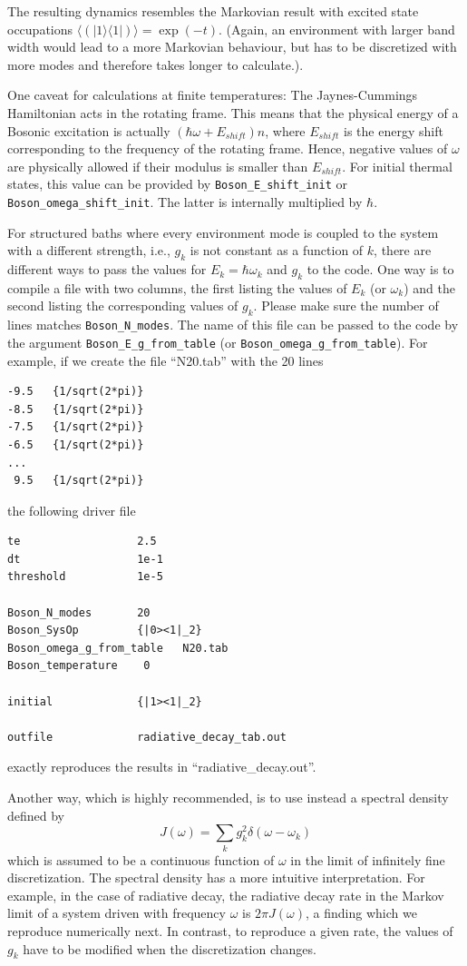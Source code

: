 \documentclass{scrartcl}
\begin{document}
The resulting dynamics resembles the Markovian result with excited state
occupations
$\langle (|1\rangle\langle 1|) \rangle= \exp(-t)$. 
(Again, an environment with larger band width would lead to a more Markovian 
behaviour, but has to be discretized with more modes and therefore takes
longer to calculate.).

One caveat for calculations at finite temperatures: The Jaynes-Cummings 
Hamiltonian acts in the rotating frame. This means that the physical energy 
of a Bosonic excitation is actually $(\hbar\omega + E_{shift}) n $, where 
$E_{shift}$ is the energy shift corresponding to the frequency of 
the rotating frame. Hence, negative values of $\omega$ are physically allowed 
if their modulus is smaller than $E_{shift}$. For initial thermal states, 
this value can be provided by \verb+Boson_E_shift_init+ or 
\verb+Boson_omega_shift_init+. The latter is internally multiplied by $\hbar$.


For structured baths where every environment mode is coupled to the system
with a different strength, i.e., $g_k$ is not constant as a function of $k$,
there are different ways to pass the values for $E_k=\hbar\omega_k$ and
$g_k$ to the code. One way is to compile a file with two columns, the first
listing the values of $E_k$ (or $\omega_k$) and the second listing 
the corresponding values of $g_k$. Please make sure the number of lines
matches \verb+Boson_N_modes+. The name of this file can be passed to the 
code by the argument \verb+Boson_E_g_from_table+ 
(or \verb+Boson_omega_g_from_table+). 
For example, if we create the file ``N20.tab'' with the 20 lines
\begin{verbatim}
-9.5   {1/sqrt(2*pi)}
-8.5   {1/sqrt(2*pi)}
-7.5   {1/sqrt(2*pi)}
-6.5   {1/sqrt(2*pi)}
...
 9.5   {1/sqrt(2*pi)}
\end{verbatim}
the following driver file
\begin{verbatim}
te                  2.5  
dt                  1e-1  
threshold           1e-5  
 
Boson_N_modes       20  
Boson_SysOp         {|0><1|_2}  
Boson_omega_g_from_table   N20.tab 
Boson_temperature    0  
 
initial             {|1><1|_2}  
 
outfile             radiative_decay_tab.out 
\end{verbatim}
exactly reproduces the results in ``radiative\_decay.out''.

Another way, which is highly recommended, is to use instead a spectral density
defined by
\begin{equation}
J(\omega)=\sum_k g_k^2 \delta(\omega-\omega_k)
\end{equation}
which is assumed to be a continuous function of $\omega$ 
in the limit of infinitely fine discretization. 
The spectral density has a more intuitive interpretation. For example, 
in the case of radiative decay, the radiative decay rate in the Markov
limit of a system driven with frequency $\omega$ is $2\pi J(\omega)$, 
a finding which we reproduce numerically next. 
In contrast, to reproduce a given rate, the values of $g_k$ have to be modified
when the discretization changes.
\end{document}
